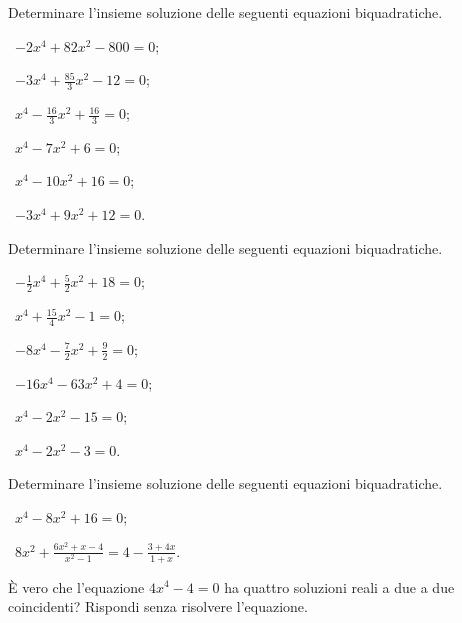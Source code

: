 \begin{esercizio}[\Ast]
 \label{ese:5.22}
Determinare l'insieme soluzione delle seguenti equazioni biquadratiche.
\begin{multicols}{3}
 \begin{enumeratea}
 \item~$-2x^4+82x^2-800=0$;
 \item~$-3x^4+\frac{85} 3x^2-12=0$;
 \item~$x^4-\frac{16} 3x^2+\frac{16} 3=0$;
 \item~$x^4-7x^2+6=0$;
 \item~$x^4-10x^2+16=0$;
 \item~$-3x^4+9x^2+12=0$.
 \end{enumeratea}
\end{multicols}
\end{esercizio}
\pagebreak
\begin{esercizio}[\Ast]
\label{ese:5.23}
Determinare l'insieme soluzione delle seguenti equazioni biquadratiche.
\begin{multicols}{3}
 \begin{enumeratea}
 \item~$-\frac 1 2x^4+\frac 5 2x^2+18=0$;
 \item~$x^4+\frac{15} 4x^2-1=0$;
 \item~$-8x^4-\frac 7 2x^2+\frac 9 2=0$;
 \item~$-16x^4-63x^2+4=0$;
 \item~$x^4-2x^2-15=0$;
 \item~$x^4-2x^2-3=0$.
 \end{enumeratea}
\end{multicols}
\end{esercizio}

\begin{esercizio}[\Ast]
\label{ese:5.24}
Determinare l'insieme soluzione delle seguenti equazioni biquadratiche.
\begin{multicols}{2}
 \begin{enumeratea}
 \item~$ x^4-8x^2+16=0 $;
 \item~$8x^2+\frac{6x^2+x-4}{x^2-1}=4-\frac{3+4x}{1+x}$.
 \end{enumeratea}
\end{multicols}
\end{esercizio}

\begin{esercizio}
\label{ese:5.25}
È vero che l'equazione $4x^4-4=0$ ha quattro soluzioni reali a due a due coincidenti? Rispondi senza risolvere l'equazione.
\end{esercizio}

